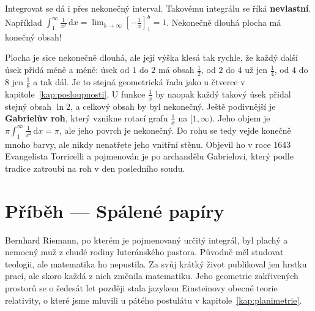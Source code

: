 \begin{note}
  Integrovat se dá i přes nekonečný interval. Takovému integrálu se říká \textbf{nevlastní}. Například $\int_1^{\infty}\frac{1}{x^2}\,\mathrm{d}x = \lim_{b\to\infty}{\left[-\frac{1}{x}\right]}_1^b = 1$. Nekonečně dlouhá plocha má konečný obsah!
  \begin{center}
  \end{center}
  Plocha je sice nekonečně dlouhá, ale její výška klesá tak rychle, že každý další úsek přidá méně a méně: úsek od $1$ do $2$ má obsah $\frac{1}{2}$, od $2$ do $4$ už jen $\frac{1}{4}$, od $4$ do $8$ jen $\frac{1}{8}$ a tak dál. Je to stejná geometrická řada jako u čtverce v kapitole~\ref{kap:posloupnosti}. U funkce $\frac{1}{x}$ by naopak každý takový úsek přidal stejný obsah $\ln 2$, a celkový obsah by byl nekonečný.
  Ještě podivnější je \textbf{Gabrielův roh}, který vznikne rotací grafu $\frac{1}{x}$ na $[1, \infty)$. Jeho objem je $\pi\int_1^{\infty}\frac{1}{x^2}\,\mathrm{d}x = \pi$, ale jeho povrch je nekonečný. Do rohu se tedy vejde konečně mnoho barvy, ale nikdy nenatřete jeho vnitřní stěnu. Objevil ho v roce 1643 Evangelista Torricelli a pojmenován je po archandělu Gabrielovi, který podle tradice zatroubí na roh v den posledního soudu.
\end{note}

\section{Příběh --- Spálené papíry}

Bernhard Riemann, po kterém je pojmenovaný určitý integrál, byl plachý a nemocný muž z chudé rodiny luteránského pastora. Původně měl studovat teologii, ale matematika ho nepustila. Za svůj krátký život publikoval jen hrstku prací, ale skoro každá z nich změnila matematiku. Jeho geometrie zakřivených prostorů se o šedesát let později stala jazykem Einsteinovy obecné teorie relativity, o které jsme mluvili u pátého postulátu v kapitole~\ref{kap:planimetrie}.

